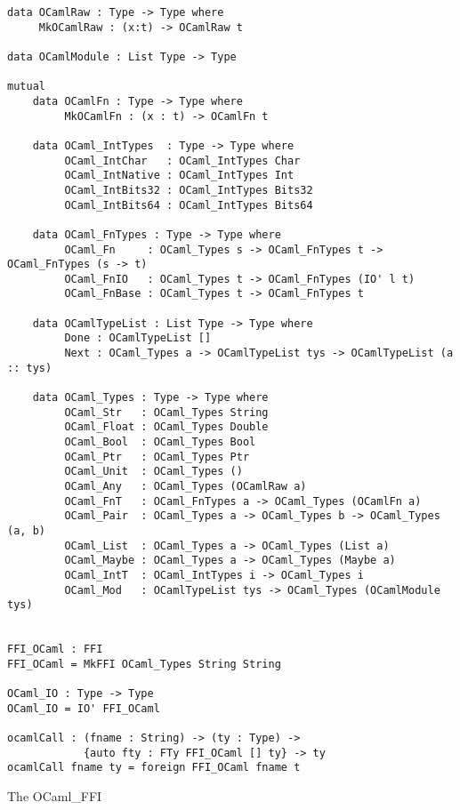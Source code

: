 \begin{listing}[H]
    \begin{verbatim}
data OCamlRaw : Type -> Type where
     MkOCamlRaw : (x:t) -> OCamlRaw t
      
data OCamlModule : List Type -> Type
      
mutual
    data OCamlFn : Type -> Type where
         MkOCamlFn : (x : t) -> OCamlFn t
        
    data OCaml_IntTypes  : Type -> Type where
         OCaml_IntChar   : OCaml_IntTypes Char
         OCaml_IntNative : OCaml_IntTypes Int
         OCaml_IntBits32 : OCaml_IntTypes Bits32
         OCaml_IntBits64 : OCaml_IntTypes Bits64
      
    data OCaml_FnTypes : Type -> Type where
         OCaml_Fn     : OCaml_Types s -> OCaml_FnTypes t -> OCaml_FnTypes (s -> t)
         OCaml_FnIO   : OCaml_Types t -> OCaml_FnTypes (IO' l t)
         OCaml_FnBase : OCaml_Types t -> OCaml_FnTypes t
      
    data OCamlTypeList : List Type -> Type where
         Done : OCamlTypeList []
         Next : OCaml_Types a -> OCamlTypeList tys -> OCamlTypeList (a :: tys)
        
    data OCaml_Types : Type -> Type where
         OCaml_Str   : OCaml_Types String
         OCaml_Float : OCaml_Types Double
         OCaml_Bool  : OCaml_Types Bool
         OCaml_Ptr   : OCaml_Types Ptr
         OCaml_Unit  : OCaml_Types ()
         OCaml_Any   : OCaml_Types (OCamlRaw a)
         OCaml_FnT   : OCaml_FnTypes a -> OCaml_Types (OCamlFn a)
         OCaml_Pair  : OCaml_Types a -> OCaml_Types b -> OCaml_Types (a, b)
         OCaml_List  : OCaml_Types a -> OCaml_Types (List a)
         OCaml_Maybe : OCaml_Types a -> OCaml_Types (Maybe a)
         OCaml_IntT  : OCaml_IntTypes i -> OCaml_Types i
         OCaml_Mod   : OCamlTypeList tys -> OCaml_Types (OCamlModule tys)
             
       
FFI_OCaml : FFI
FFI_OCaml = MkFFI OCaml_Types String String
      
OCaml_IO : Type -> Type
OCaml_IO = IO' FFI_OCaml
      
ocamlCall : (fname : String) -> (ty : Type) ->
            {auto fty : FTy FFI_OCaml [] ty} -> ty
ocamlCall fname ty = foreign FFI_OCaml fname t
    \end{verbatim}
    \caption{The OCaml\_FFI}
\end{listing}




